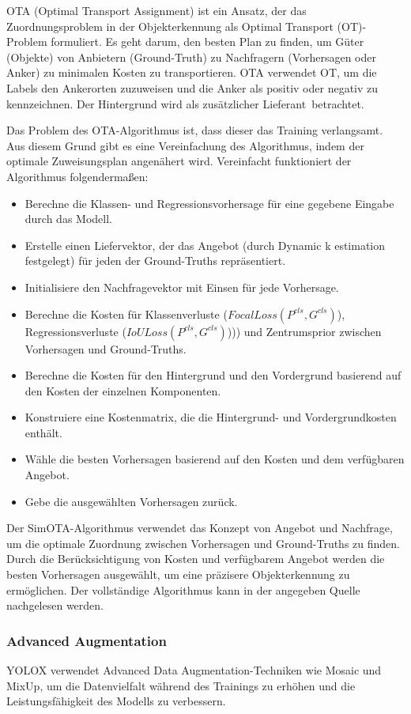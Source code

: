 OTA (Optimal Transport Assignment) ist ein Ansatz, der das Zuordnungsproblem in der Objekterkennung als Optimal Transport (OT)-Problem formuliert. Es geht darum, den besten Plan zu finden, um Güter (Objekte) von Anbietern (Ground-Truth) zu Nachfragern (Vorhersagen oder Anker) zu minimalen Kosten zu transportieren. OTA verwendet OT, um die Labels den Ankerorten zuzuweisen und die Anker als positiv oder negativ zu kennzeichnen. Der Hintergrund wird als zusätzlicher \glqq Lieferant\grqq\ betrachtet. 

Das Problem des OTA-Algorithmus ist, dass dieser das Training verlangsamt. Aus diesem Grund gibt es eine Vereinfachung des Algorithmus, indem der optimale Zuweisungsplan angenähert wird. Vereinfacht funktioniert der Algorithmus folgendermaßen:
\begin{itemize}
	\item Berechne die Klassen- und Regressionsvorhersage für eine gegebene Eingabe durch das Modell.
	\item Erstelle einen Liefervektor, der das Angebot (durch Dynamic k estimation festgelegt) für jeden der Ground-Truths repräsentiert.
	\item Initialisiere den Nachfragevektor mit Einsen für jede Vorhersage.
	\item Berechne die Kosten für Klassenverluste ($FocalLoss(P^{cls}, G^{cls})$), Regressionsverluste ($IoULoss(P^{cls}, G^{cls})$))) und Zentrumsprior zwischen Vorhersagen und Ground-Truths.
	\item Berechne die Kosten für den Hintergrund und den Vordergrund basierend auf den Kosten der einzelnen Komponenten.
	\item Konstruiere eine Kostenmatrix, die die Hintergrund- und Vordergrundkosten enthält.
	\item Wähle die besten Vorhersagen basierend auf den Kosten und dem verfügbaren Angebot.
	\item Gebe die ausgewählten Vorhersagen zurück.
\end{itemize}

Der SimOTA-Algorithmus verwendet das Konzept von Angebot und Nachfrage, um die optimale Zuordnung zwischen Vorhersagen und Ground-Truths zu finden. Durch die Berücksichtigung von Kosten und verfügbarem Angebot werden die besten Vorhersagen ausgewählt, um eine präzisere Objekterkennung zu ermöglichen. Der vollständige Algorithmus kann in der angegeben Quelle nachgelesen werden.  \cite{yoloxExplanationSimOTA}


\subsubsection{Advanced Augmentation}\label{chap:advancedAug}
YOLOX verwendet Advanced Data Augmentation-Techniken wie Mosaic und MixUp, um die Datenvielfalt während des Trainings zu erhöhen und die Leistungsfähigkeit des Modells zu verbessern.

